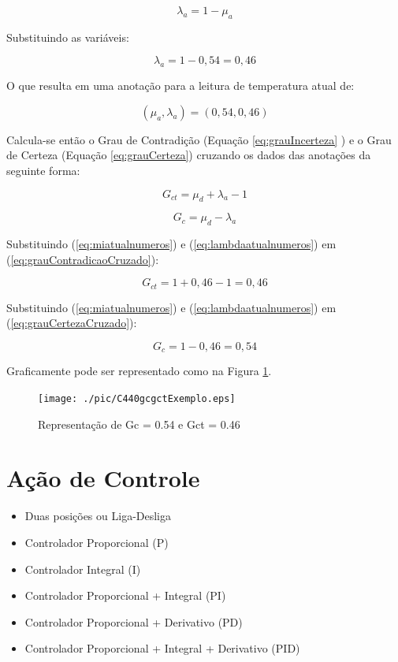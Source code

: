 \begin{equation}
\lambda _{a}= 1 - \mu _{a}
\label{eq:lambdaatual}
\end{equation}

Substituindo as variáveis:

\begin{equation}
\lambda _{a}= 1 - 0,54 = 0,46
\label{eq:lambdaatualnumeros}
\end{equation}

O que resulta em uma anotação para a leitura de temperatura atual de: 

\begin{equation}
( \mu _{a}, \lambda _{a} ) = (0,54 , 0,46)
\label{eq:valoratual}
\end{equation}

Calcula-se então o Grau de Contradição (Equação \ref{eq:grauIncerteza} ) e o Grau de Certeza (Equação \ref{eq:grauCerteza}) cruzando os dados das anotações da seguinte forma:

\begin{equation}
G _{ct} = \mu _{d} + \lambda _{a} - 1
\label{eq:grauContradicaoCruzado}
\end{equation}

\begin{equation}
G _{c} = \mu _{d} - \lambda _{a}
\label{eq:grauCertezaCruzado}
\end{equation}


Substituindo (\ref{eq:miatualnumeros}) e (\ref{eq:lambdaatualnumeros}) em (\ref{eq:grauContradicaoCruzado}):

\begin{equation}
G _{ct} = 1 + 0,46 - 1 = 0,46
\label{eq:grauContradicaoResulta}
\end{equation}

Substituindo (\ref{eq:miatualnumeros}) e (\ref{eq:lambdaatualnumeros}) em (\ref{eq:grauCertezaCruzado}):

\begin{equation}
G _{c} = 1 - 0,46 = 0,54
\label{eq:grauCertezaResulta}
\end{equation}

Graficamente pode ser representado como na Figura \ref{fig:gcgctExemplo}.

\begin{figure}[!htb]
\center\texttt{[image: ./pic/C440gcgctExemplo.eps]}
\caption{Representação de Gc = 0.54 e Gct = 0.46}
\label{fig:gcgctExemplo}
\end{figure}

\newpage
\section{Ação de Controle}

\begin{itemize}
	\item Duas posições ou Liga-Desliga
	\item Controlador Proporcional (P)
	\item Controlador Integral (I)
	\item Controlador Proporcional + Integral (PI)
	\item Controlador Proporcional + Derivativo (PD)
	\item Controlador Proporcional + Integral + Derivativo (PID)
	
\end{itemize}

